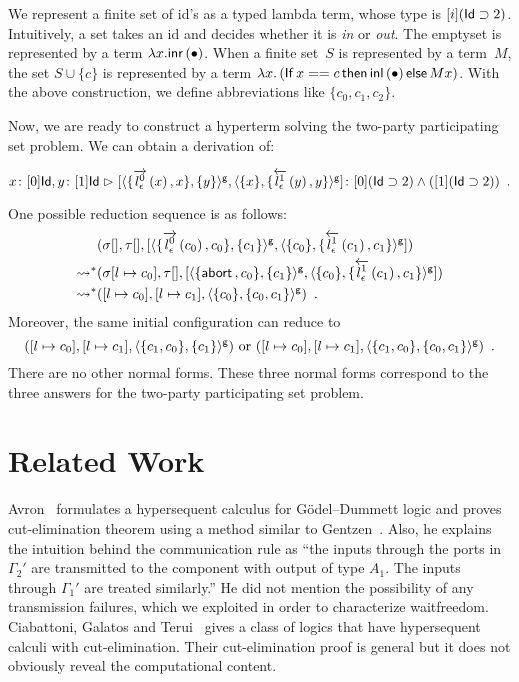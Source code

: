 {We represent a finite set of id's as a
typed lambda term, whose type is $[i](\Id\supset 2)$.  Intuitively, a
set takes an id and decides whether it is \textit{in} or \textit{out}.
The emptyset is represented by a term $\lambda x. \linr {\bullet}$.
When a finite set~$S$ is represented by a term~$M$,
the set $S \cup \{c\}$ is represented by a term
$\lambda x.\left(\ifte{x==c}{\linl {\bullet}}{Mx}\right)$.
With the above construction, we define abbreviations
like $\{c_0, c_1, c_2\}$.

Now, we are ready to construct a hyperterm solving the two-party
participating set problem.
We can  obtain a derivation of:
\begin{center}
 \small
$
 \tj{x}{[0]\Id},
 \tj{y}{[1]\Id}
 \tr
 \tj{\cotuple{\gpair{\{\ltor 0 l \epsilon x, x\}, \{y\}},
 \gpair{\{x\}, \{\rtol 1 l\epsilon y, y\}}
 }}
 {[0](\Id\supset 2)\wedge ([1](\Id\supset 2))}\enspace.$
\end{center}

One possible reduction sequence is as follows:
\begin{align*}
 & \conf{[]}{[]}
 {\cotuple{\gpair{\{\ltor 0 l \epsilon {c_0}, {c_0}\}, \{{c_1}\}},
 \gpair {\{{c_0}\}, \{\rtol 1 l\epsilon {c_1}, {c_1}\}}}} \\
 \reduction &
 \conf{[l\mapsto {c_0}]}{[]}
 {
 \cotuple{
 \gpair{\{\abort, {c_0}\}, \{{c_1}\}},
 \gpair{\{{c_0}\}, \{\rtol 1 l\epsilon {c_1}, {c_1}\}}
 }
 }
 \\
 \reduction &
 \concreteconf{[l\mapsto {c_0}]}{[l\mapsto {c_1}]}{\gpair{\{{c_0}\}, \{c_0, c_1\}}}\enspace.
\end{align*}
Moreover, the same initial configuration can reduce to
\[
 \concreteconf{[l\mapsto c_0]}{[l\mapsto c_1]}{\gpair{\{c_1,c_0\},
 \{c_1\}}}\text{ or }
 \concreteconf{[l\mapsto c_0]}{[l\mapsto c_1]}{\gpair{\{c_1,c_0\},
 \{c_0, c_1\}}}\enspace.
\]
There are no other normal forms.
These three normal forms correspond to the three answers for the
two-party participating set problem.

\section{Related Work}
\label{related}
Avron~\cite{avron91} formulates a
hypersequent calculus for G\"odel--Dummett logic and proves
cut-elimination theorem using a method
similar to Gentzen~\cite{gentzen}.
Also, he explains the intuition behind the communication rule as
``the inputs through the ports in $\Gamma_2'$ are transmitted to the
component with output of type $A_1.$  The inputs through $\Gamma_1'$ are
treated similarly.''  He did not mention the possibility of
any transmission failures, which we exploited
in order to characterize waitfreedom.
Ciabattoni, Galatos and Terui~\cite{alg} gives a class of logics
that have
hypersequent calculi with
cut-elimination.
Their cut-elimination proof is general but it does not
obviously reveal the computational content.

}
